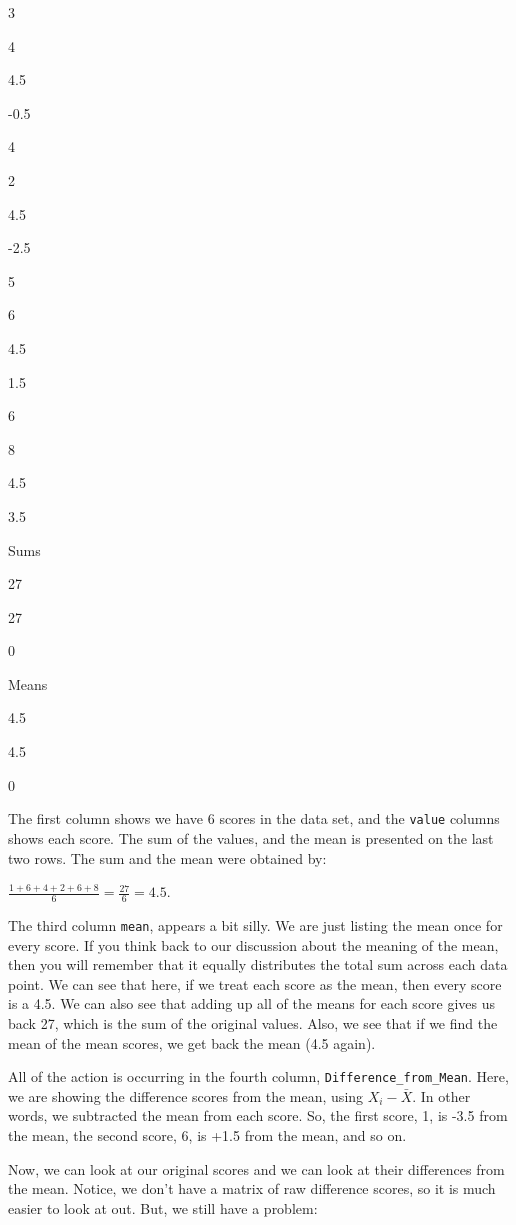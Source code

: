 \documentclass[
]{book}
\begin{document}
3

4

4.5

-0.5

4

2

4.5

-2.5

5

6

4.5

1.5

6

8

4.5

3.5

Sums

27

27

0

Means

4.5

4.5

0

The first column shows we have 6 scores in the data set, and the \texttt{value} columns shows each score. The sum of the values, and the mean is presented on the last two rows. The sum and the mean were obtained by:

\(\frac{1+6+4+2+6+8}{6} = \frac{27}{6} = 4.5\).

The third column \texttt{mean}, appears a bit silly. We are just listing the mean once for every score. If you think back to our discussion about the meaning of the mean, then you will remember that it equally distributes the total sum across each data point. We can see that here, if we treat each score as the mean, then every score is a 4.5. We can also see that adding up all of the means for each score gives us back 27, which is the sum of the original values. Also, we see that if we find the mean of the mean scores, we get back the mean (4.5 again).

All of the action is occurring in the fourth column, \texttt{Difference\_from\_Mean}. Here, we are showing the difference scores from the mean, using \(X_{i}-\bar{X}\). In other words, we subtracted the mean from each score. So, the first score, 1, is -3.5 from the mean, the second score, 6, is +1.5 from the mean, and so on.

Now, we can look at our original scores and we can look at their differences from the mean. Notice, we don't have a matrix of raw difference scores, so it is much easier to look at out. But, we still have a problem:
\end{document}
